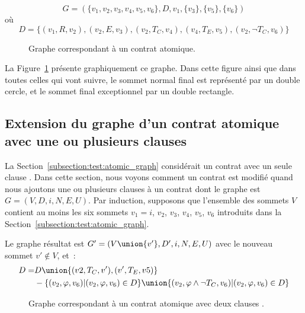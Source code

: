 $$G = (
  \{v_1, v_2, v_3, v_4, v_5, v_6\},
  D,
  v_1,
  \{v_3\},
  \{v_5\},
  \{v_6\}
)$$
%
où
%
$$D = \{
  (v_1, R, v_2),
  (v_2, E, v_3),
  (v_2, T_C, v_4),
  (v_4, T_E, v_5),
  (v_2, \neg T_C, v_6)
\}$$

\begin{figure}


\caption{\label{figure:test:atomic_graph} Graphe correspondant à un contrat
atomique.}

\end{figure}

La Figure~\ref{figure:test:atomic_graph} présente graphiquement ce graphe. Dans
cette figure ainsi que dans toutes celles qui vont suivre, le sommet normal
final est représenté par un double cercle, et le sommet final exceptionnel par
un double rectangle.

\subsection{Extension du graphe d'un contrat atomique avec une ou plusieurs
clauses \athrowable}
\label{subsection:test:throwable_graph}

La Section~\ref{subsection:test:atomic_graph} considérait un contrat avec un
seule clause \athrowable. Dans cette section, nous voyons comment un contrat est
modifié quand nous ajoutons une ou plusieurs clauses  à un contrat dont le graphe est $G = (V, D, i, N, E, U)$. Par
induction, supposons que l'ensemble des sommets $V$ contient au moins les six
sommets $v_1 = i$, $v_2$, $v_3$, $v_4$, $v_5$, $v_6$ introduits dans la
Section~\ref{subsection:test:atomic_graph}.

Le graphe résultat est $G' = (V \union \{v'\}, D', i, N, E, U)$ avec le nouveau
sommet $v' \notin V$, et~:
%
\begin{equation*}
\centering
\begin{aligned}
D = & D \union \{(v2, T_C, v'), (v', T_E, v5)\} \\
    & - \{(v_2, \varphi, v_6) \vert (v_2, \varphi, v_6) \in D\} \union
      \{(v_2, \varphi \land \neg T_C, v_6) \vert (v_2, \varphi, v_6) \in D\}
\end{aligned}
\end{equation*}

\begin{figure}


\caption{\label{figure:test:throwable_graph} Graphe correspondant à un contrat
atomique avec deux clauses \athrowable.}

\end{figure}

